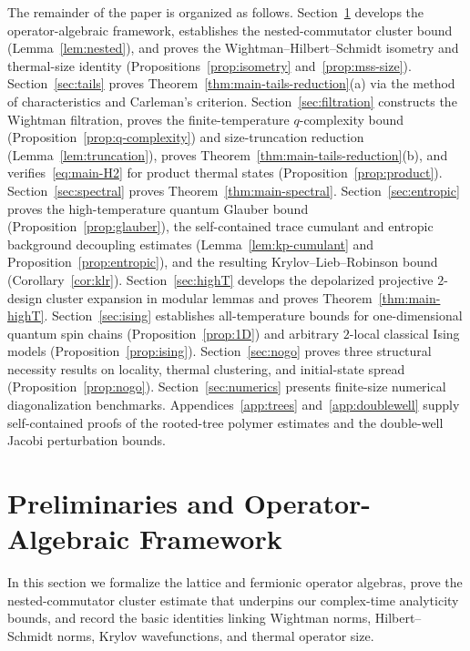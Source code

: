 \documentclass[11pt,a4paper]{article}
\numberwithin{equation}{section}
\theoremstyle{plain}
\theoremstyle{definition}
\begin{document}
The remainder of the paper is organized as follows. Section~\ref{sec:prelim} develops the operator-algebraic framework, establishes the nested-commutator cluster bound (Lemma~\ref{lem:nested}), and proves the Wightman--Hilbert--Schmidt isometry and thermal-size identity (Propositions~\ref{prop:isometry} and~\ref{prop:mss-size}). Section~\ref{sec:tails} proves Theorem~\ref{thm:main-tails-reduction}(a) via the method of characteristics and Carleman's criterion. Section~\ref{sec:filtration} constructs the Wightman filtration, proves the finite-temperature $q$-complexity bound (Proposition~\ref{prop:q-complexity}) and size-truncation reduction (Lemma~\ref{lem:truncation}), proves Theorem~\ref{thm:main-tails-reduction}(b), and verifies~\eqref{eq:main-H2} for product thermal states (Proposition~\ref{prop:product}). Section~\ref{sec:spectral} proves Theorem~\ref{thm:main-spectral}. Section~\ref{sec:entropic} proves the high-temperature quantum Glauber bound (Proposition~\ref{prop:glauber}), the self-contained trace cumulant and entropic background decoupling estimates (Lemma~\ref{lem:kp-cumulant} and Proposition~\ref{prop:entropic}), and the resulting Krylov--Lieb--Robinson bound (Corollary~\ref{cor:klr}). Section~\ref{sec:highT} develops the depolarized projective $2$-design cluster expansion in modular lemmas and proves Theorem~\ref{thm:main-highT}. Section~\ref{sec:ising} establishes all-temperature bounds for one-dimensional quantum spin chains (Proposition~\ref{prop:1D}) and arbitrary $2$-local classical Ising models (Proposition~\ref{prop:ising}). Section~\ref{sec:nogo} proves three structural necessity results on locality, thermal clustering, and initial-state spread (Proposition~\ref{prop:nogo}). Section~\ref{sec:numerics} presents finite-size numerical diagonalization benchmarks. Appendices~\ref{app:trees} and~\ref{app:doublewell} supply self-contained proofs of the rooted-tree polymer estimates and the double-well Jacobi perturbation bounds.

\section{Preliminaries and Operator-Algebraic Framework}\label{sec:prelim}

In this section we formalize the lattice and fermionic operator algebras, prove the nested-commutator cluster estimate that underpins our complex-time analyticity bounds, and record the basic identities linking Wightman norms, Hilbert--Schmidt norms, Krylov wavefunctions, and thermal operator size.
\end{document}
